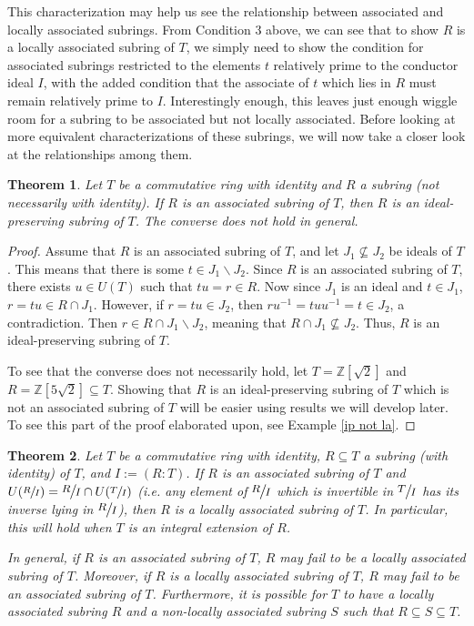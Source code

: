 \documentclass[12pt]{amsart}
\newtheorem{theorem}{Theorem}[section]
\theoremstyle{definition}
\newcommand{\bZ}{\mathbb Z}
\newcommand{\quot}[2]{\large\sfrac{#1}{#2}\normalsize}
\begin{document}
	This characterization may help us see the relationship between associated and locally associated subrings. From Condition 3 above, we can see that to show $R$ is a locally associated subring of $T$, we simply need to show the condition for associated subrings restricted to the elements $t$ relatively prime to the conductor ideal $I$, with the added condition that the associate of $t$ which lies in $R$ must remain relatively prime to $I$. Interestingly enough, this leaves just enough wiggle room for a subring to be associated but not locally associated. Before looking at more equivalent characterizations of these subrings, we will now take a closer look at the relationships among them.
	
	\begin{theorem}
		\label{ass implies ip}
		Let $T$ be a commutative ring with identity and $R$ a subring (not necessarily with identity). If $R$ is an associated subring of $T$, then $R$ is an ideal-preserving subring of $T$. The converse does not hold in general.
	\end{theorem}
	
	\begin{proof}
		Assume that $R$ is an associated subring of $T$, and let $J_1\nsubseteq J_2$ be ideals of $T$. This means that there is some $t\in J_1\backslash J_2$. Since $R$ is an associated subring of $T$, there exists $u\in U(T)$ such that $tu=r\in R$. Now since $J_1$ is an ideal and $t\in J_1$, $r=tu\in R\cap J_1$. However, if $r=tu\in J_2$, then $ru^{-1}=tuu^{-1}=t\in J_2$, a contradiction. Then $r\in R\cap J_1\backslash J_2$, meaning that $R\cap J_1\nsubseteq J_2$. Thus, $R$ is an ideal-preserving subring of $T$.
		
		To see that the converse does not necessarily hold, let $T=\bZ[\sqrt{2}]$ and $R=\bZ[5\sqrt{2}]\subseteq T$. Showing that $R$ is an ideal-preserving subring of $T$ which is not an associated subring of $T$ will be easier using results we will develop later. To see this part of the proof elaborated upon, see Example \ref{ip not la}.
	\end{proof}
	
	\begin{theorem}
		\label{ass implies la}
		Let $T$ be a commutative ring with identity, $R\subseteq T$ a subring (with identity) of $T$, and $I:=(R:T)$. If $R$ is an associated subring of $T$ and $U(\sfrac{R}{I})=\quot{R}{I}\cap U(\sfrac{T}{I})$ (i.e. any element of $\quot{R}{I}$ which is invertible in $\quot{T}{I}$ has its inverse lying in $\quot{R}{I}$), then $R$ is a locally associated subring of $T$. In particular, this will hold when $T$ is an integral extension of $R$.
		
		In general, if $R$ is an associated subring of $T$, $R$ may fail to be a locally associated subring of $T$. Moreover, if $R$ is a locally associated subring of $T$, $R$ may fail to be an associated subring of $T$. Furthermore, it is possible for $T$ to have a locally associated subring $R$ and a non-locally associated subring $S$ such that $R\subseteq S\subseteq T$.
	\end{theorem}
	
\end{document}
